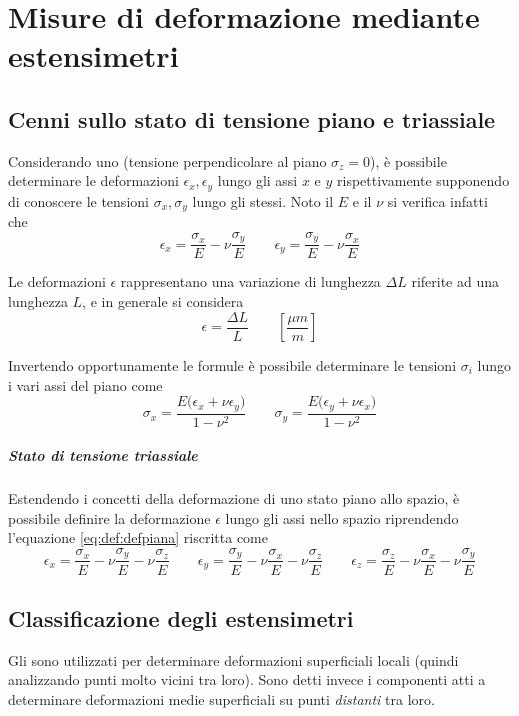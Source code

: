 \chapter{Misure di deformazione mediante estensimetri}

\section{Cenni sullo stato di tensione piano e triassiale}
	Considerando uno  (tensione perpendicolare al piano $\sigma_z=0$), è possibile determinare le deformazioni $\epsilon_x, \epsilon_y$ lungo gli assi $x$ e $y$ rispettivamente supponendo di conoscere le tensioni $\sigma_x,\sigma_y$ lungo gli stessi. Noto il  $E$ e il  $\nu$ si verifica infatti che
	\begin{equation} \label{eq:def:defpiana}
		\epsilon_x = \frac{\sigma_x}{E} - \nu \frac{\sigma_y}{E} \qquad \epsilon_y = \frac{\sigma_y}{E} - \nu \frac{\sigma_x}{E}
	\end{equation}
	
	Le deformazioni $\epsilon$ rappresentano una variazione di lunghezza $\Delta L$ riferite ad una lunghezza $L$, e in generale si considera
	\[ \epsilon = \frac{\Delta L}{L} \qquad \left[\frac {\mu m} m \right]\]
	
	Invertendo opportunamente le formule è possibile determinare le tensioni $\sigma_i$ lungo i vari assi del piano come
	\[ \sigma_x = \frac{E \big(\epsilon_x + \nu \epsilon_y \big)}{1-\nu^2} \qquad \sigma_y = \frac{E \big(\epsilon_y + \nu \epsilon_x \big)}{1-\nu^2} \]
	
	\paragraph{Stato di tensione triassiale} Estendendo i concetti della deformazione di uno stato piano allo spazio, è possibile definire la deformazione $\epsilon$ lungo gli assi nello spazio riprendendo l'equazione \ref{eq:def:defpiana} riscritta come
	\begin{equation}
		\epsilon_x = \frac{\sigma_x}{E} - \nu \frac{\sigma_y}{E} - \nu \frac{\sigma_z}{E} \qquad \epsilon_y = \frac{\sigma_y}{E} - \nu \frac{\sigma_x}{E} - \nu \frac{\sigma_z}{E} \qquad \epsilon_z = \frac{\sigma_z}{E} - \nu \frac{\sigma_x}{E} - \nu \frac{\sigma_y}{E}
	\end{equation}

\section{Classificazione degli estensimetri}
	Gli  sono utilizzati per determinare deformazioni superficiali locali (quindi analizzando punti molto vicini tra loro). Sono detti invece  i componenti atti a determinare deformazioni medie superficiali su punti \textit{distanti} tra loro.
	

